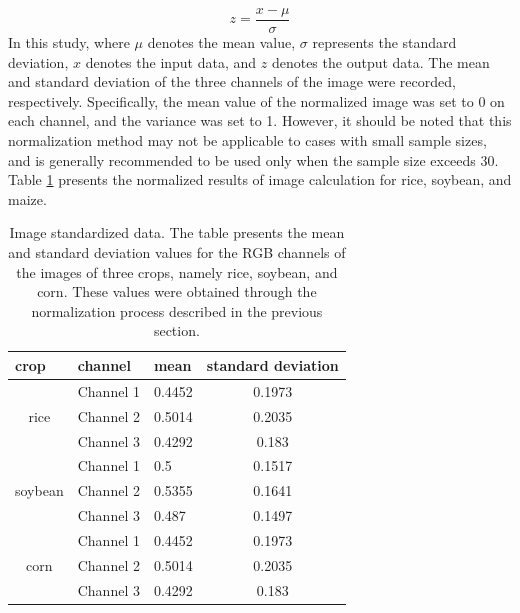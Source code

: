 \documentclass[acmsmall, screen]{acmart}
\begin{document}
\begin{equation}
  z=\frac{x-\mu}{\sigma}
\end{equation}
In this study, where \begin{math}
  \mu
\end{math} denotes the mean value, \begin{math}
  \sigma
\end{math} represents the standard deviation, \begin{math}
  x
\end{math} denotes the input data, and \begin{math}
  z
\end{math} denotes the output data. The mean and standard deviation of the three channels of the image were recorded, respectively. Specifically, the mean value of the normalized image was set to 0 on each channel, and the variance was set to 1. However, it should be noted that this normalization method may not be applicable to cases with small sample sizes, and is generally recommended to be used only when the sample size exceeds 30. Table \ref{tab:image_standardized_data} presents the normalized results of image calculation for rice, soybean, and maize.

\begin{table}[htbp]
  \caption{Image standardized data. The table presents the mean and standard deviation values for the RGB channels of the images of three crops, namely rice, soybean, and corn. These values were obtained through the normalization process described in the previous section.}
  \label{tab:image_standardized_data}
  \begin{tabular}{lllc}
    \toprule
    crop                                            & channel   & mean   & standard deviation \\
    \midrule
    \multicolumn{1}{c}{\multirow{3}[1]{*}{rice}}    & Channel 1 & 0.4452 & 0.1973             \\
                                                    & Channel 2 & 0.5014 & 0.2035             \\
                                                    & Channel 3 & 0.4292 & 0.183              \\
    \midrule
    \multicolumn{1}{c}{\multirow{3}[0]{*}{soybean}} & Channel 1 & 0.5    & 0.1517             \\
                                                    & Channel 2 & 0.5355 & 0.1641             \\
                                                    & Channel 3 & 0.487  & 0.1497             \\
    \midrule
    \multicolumn{1}{c}{\multirow{3}[1]{*}{corn}}    & Channel 1 & 0.4452 & 0.1973             \\
                                                    & Channel 2 & 0.5014 & 0.2035             \\
                                                    & Channel 3 & 0.4292 & 0.183              \\
    \bottomrule
  \end{tabular}
\end{table}
\end{document}
